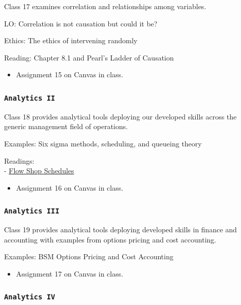 \documentclass[11pt,]{article}
\begin{document}
Class 17 examines correlation and relationships among variables.

LO: Correlation is not causation but could it be?

Ethics: The ethics of intervening randomly

Reading: Chapter 8.1 and Pearl's Ladder of Causation

\begin{itemize}
\item Assignment 15 on Canvas in class.
\end{itemize}

\subsubsection{\texorpdfstring{\texttt{Analytics\ II}}{Analytics II}}\label{analytics-ii}

Class 18 provides analytical tools deploying our developed skills across
the generic management field of operations.

Examples: Six sigma methods, scheduling, and queueing theory

Readings:\\
-
\href{https://www.ebsco.com/research-starters/business-and-management/flow-shop-scheduling}{Flow
Shop Schedules}

\begin{itemize}
\item Assignment 16 on Canvas in class.
\end{itemize}

\subsubsection{\texorpdfstring{\texttt{Analytics\ III}}{Analytics III}}\label{analytics-iii}

Class 19 provides analytical tools deploying developed skills in finance
and accounting with examples from options pricing and cost accounting.

Examples: BSM Options Pricing and Cost Accounting

\begin{itemize}
\item Assignment 17 on Canvas in class.
\end{itemize}

\subsubsection{\texorpdfstring{\texttt{Analytics\ IV}}{Analytics IV}}\label{analytics-iv}
\end{document}
